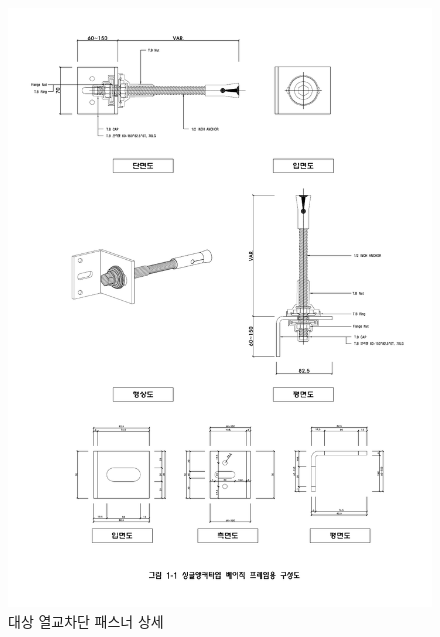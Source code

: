 \documentclass[9pt]{beamer}
\begin{document}
	\begin{frame}
\begin{figure}
\includegraphics[height=.95\textheight]{SINGLE_BASIC_DETAIL}
\caption{대상 열교차단 패스너 상세}
\end{figure}
	\end{frame}
\end{document}
